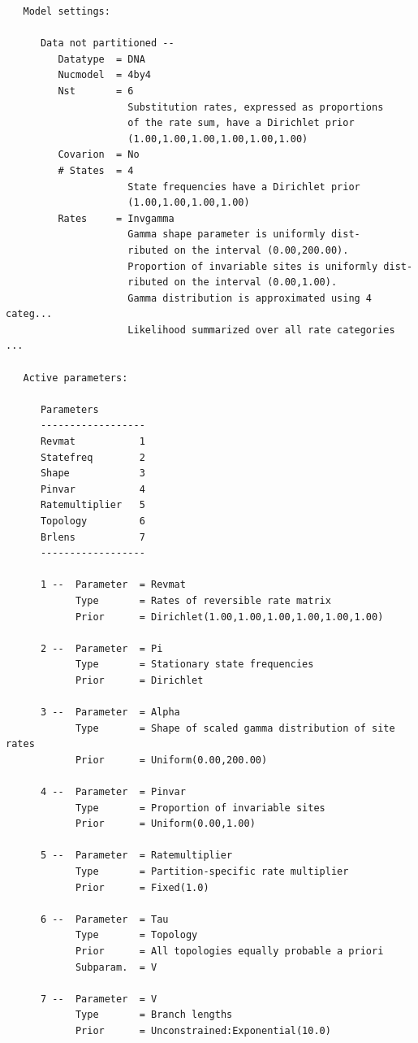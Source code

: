 \documentclass[12pt]{book}
\begin{document}
\begin{singlespacing}
\small
\begin{verbatim}
   Model settings:

      Data not partitioned --
         Datatype  = DNA
         Nucmodel  = 4by4
         Nst       = 6
                     Substitution rates, expressed as proportions
                     of the rate sum, have a Dirichlet prior
                     (1.00,1.00,1.00,1.00,1.00,1.00)
         Covarion  = No
         # States  = 4
                     State frequencies have a Dirichlet prior
                     (1.00,1.00,1.00,1.00)
         Rates     = Invgamma
                     Gamma shape parameter is uniformly dist-
                     ributed on the interval (0.00,200.00).
                     Proportion of invariable sites is uniformly dist-
                     ributed on the interval (0.00,1.00).
                     Gamma distribution is approximated using 4 categ...
                     Likelihood summarized over all rate categories ...

   Active parameters: 

      Parameters
      ------------------
      Revmat           1
      Statefreq        2
      Shape            3
      Pinvar           4
      Ratemultiplier   5
      Topology         6
      Brlens           7
      ------------------

      1 --  Parameter  = Revmat
            Type       = Rates of reversible rate matrix
            Prior      = Dirichlet(1.00,1.00,1.00,1.00,1.00,1.00)

      2 --  Parameter  = Pi
            Type       = Stationary state frequencies
            Prior      = Dirichlet

      3 --  Parameter  = Alpha
            Type       = Shape of scaled gamma distribution of site rates
            Prior      = Uniform(0.00,200.00)

      4 --  Parameter  = Pinvar
            Type       = Proportion of invariable sites
            Prior      = Uniform(0.00,1.00)

      5 --  Parameter  = Ratemultiplier
            Type       = Partition-specific rate multiplier
            Prior      = Fixed(1.0)

      6 --  Parameter  = Tau
            Type       = Topology
            Prior      = All topologies equally probable a priori
            Subparam.  = V

      7 --  Parameter  = V
            Type       = Branch lengths
            Prior      = Unconstrained:Exponential(10.0)
\end{verbatim}
\normalsize
\end{singlespacing}
\end{document}
